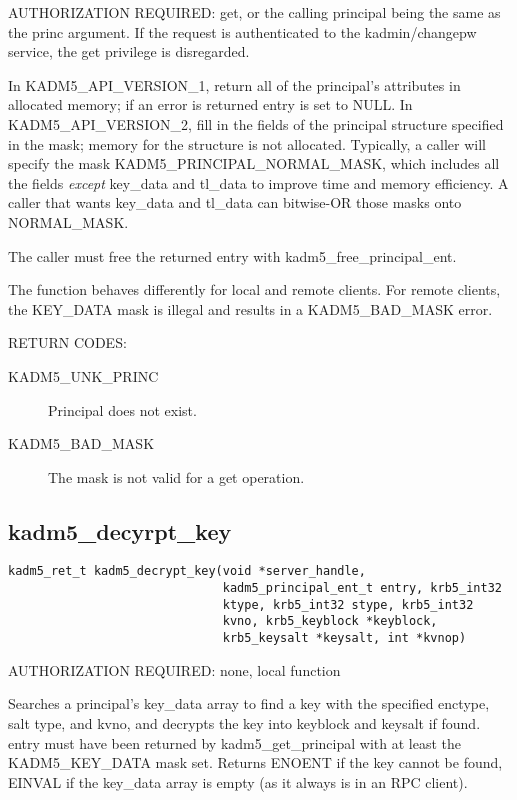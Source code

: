 AUTHORIZATION REQUIRED: get, or the calling principal being the same
as the princ argument.  If the request is authenticated to the
kadmin/changepw service, the get privilege is disregarded.

In KADM5_API_VERSION_1, return all of the principal's attributes in
allocated memory; if an error is returned entry is set to NULL.  In
KADM5_API_VERSION_2, fill in the fields of the principal structure
specified in the mask; memory for the structure is not allocated.
Typically, a caller will specify the mask KADM5_PRINCIPAL_NORMAL_MASK,
which includes all the fields {\it except} key_data and tl_data to
improve time and memory efficiency.  A caller that wants key_data and
tl_data can bitwise-OR those masks onto NORMAL_MASK.

The caller must free the returned entry with kadm5_free_principal_ent.


The function behaves differently for local and remote clients.  For
remote clients, the KEY_DATA mask is illegal and results in a
KADM5_BAD_MASK error.

RETURN CODES:

\begin{description}
\item[KADM5_UNK_PRINC] Principal does not exist.
\item[KADM5_BAD_MASK] The mask is not valid for a get operation.

\end{description}

\subsection{kadm5_decyrpt_key}

\begin{verbatim}
kadm5_ret_t kadm5_decrypt_key(void *server_handle,
                              kadm5_principal_ent_t entry, krb5_int32
                              ktype, krb5_int32 stype, krb5_int32
                              kvno, krb5_keyblock *keyblock,
                              krb5_keysalt *keysalt, int *kvnop)
\end{verbatim}

AUTHORIZATION REQUIRED: none, local function

Searches a principal's key_data array to find a key with the specified
enctype, salt type, and kvno, and decrypts the key into keyblock and
keysalt if found.  entry must have been returned by
kadm5_get_principal with at least the KADM5_KEY_DATA mask set.
Returns ENOENT if the key cannot be found, EINVAL if the key_data
array is empty (as it always is in an RPC client).

